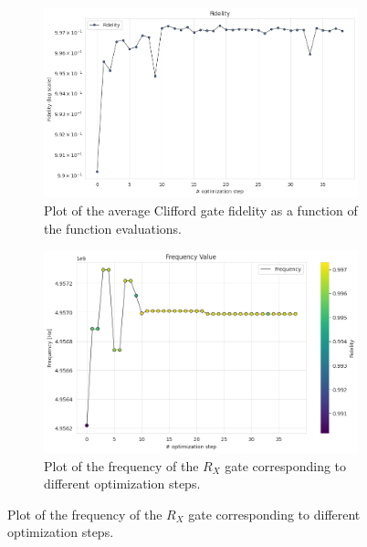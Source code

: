 \begin{figure}[htbp]
    \centering
    \begin{subfigure}[t]{0.45\textwidth}
        \includegraphics[width=\textwidth]{figures/png/RB_optimization/NM/post_ft_true/NM_fid.png}
        \caption{Plot of the average Clifford gate fidelity as a function of the function evaluations.}
        \label{NM_true_fig:fidelity}
    \end{subfigure}
    \hfill
    \begin{subfigure}[t]{0.45\textwidth}
        \includegraphics[width=\textwidth]{figures/png/RB_optimization/NM/post_ft_true/frequency.png}
        \caption{Plot of the frequency of the $R_X$ gate corresponding to different optimization steps.}
        \label{NM_true_fig:frequency}
    \end{subfigure}

    \vspace{0.5cm}


\end{figure}
